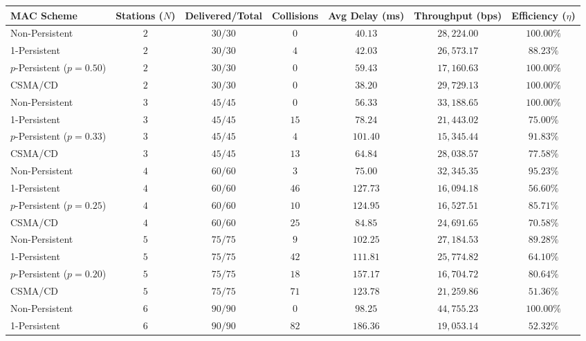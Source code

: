 \documentclass[11pt,a4paper]{article}
\begin{document}
\begin{table}[htbp]
\centering
\scriptsize
\renewcommand{\arraystretch}{1.15}
\begin{tabular}{l c c c c c c}
\rowcolor{tableheader}
\color{white}MAC Scheme & \color{white}Stations ($N$) & \color{white}Delivered/Total & \color{white}Collisions & \color{white}Avg Delay (ms) & \color{white}Throughput (bps) & \color{white}Efficiency ($\eta$) \\
\hline
Non-Persistent & $2$ & $30 / 30$ & $0$ & $40.13$ & $28{,}224.00$ & $100.00\%$ \\
1-Persistent & $2$ & $30 / 30$ & $4$ & $42.03$ & $26{,}573.17$ & $88.23\%$ \\
$p$-Persistent ($p=0.50$) & $2$ & $30 / 30$ & $0$ & $59.43$ & $17{,}160.63$ & $100.00\%$ \\
CSMA/CD & $2$ & $30 / 30$ & $0$ & $38.20$ & $29{,}729.13$ & $100.00\%$ \\
\hline
Non-Persistent & $3$ & $45 / 45$ & $0$ & $56.33$ & $33{,}188.65$ & $100.00\%$ \\
1-Persistent & $3$ & $45 / 45$ & $15$ & $78.24$ & $21{,}443.02$ & $75.00\%$ \\
$p$-Persistent ($p=0.33$) & $3$ & $45 / 45$ & $4$ & $101.40$ & $15{,}345.44$ & $91.83\%$ \\
CSMA/CD & $3$ & $45 / 45$ & $13$ & $64.84$ & $28{,}038.57$ & $77.58\%$ \\
\hline
Non-Persistent & $4$ & $60 / 60$ & $3$ & $75.00$ & $32{,}345.35$ & $95.23\%$ \\
1-Persistent & $4$ & $60 / 60$ & $46$ & $127.73$ & $16{,}094.18$ & $56.60\%$ \\
$p$-Persistent ($p=0.25$) & $4$ & $60 / 60$ & $10$ & $124.95$ & $16{,}527.51$ & $85.71\%$ \\
CSMA/CD & $4$ & $60 / 60$ & $25$ & $84.85$ & $24{,}691.65$ & $70.58\%$ \\
\hline
Non-Persistent & $5$ & $75 / 75$ & $9$ & $102.25$ & $27{,}184.53$ & $89.28\%$ \\
1-Persistent & $5$ & $75 / 75$ & $42$ & $111.81$ & $25{,}774.82$ & $64.10\%$ \\
$p$-Persistent ($p=0.20$) & $5$ & $75 / 75$ & $18$ & $157.17$ & $16{,}704.72$ & $80.64\%$ \\
CSMA/CD & $5$ & $75 / 75$ & $71$ & $123.78$ & $21{,}259.86$ & $51.36\%$ \\
\hline
Non-Persistent & $6$ & $90 / 90$ & $0$ & $98.25$ & $44{,}755.23$ & $100.00\%$ \\
1-Persistent & $6$ & $90 / 90$ & $82$ & $186.36$ & $19{,}053.14$ & $52.32\%$ \\

\end{tabular}
\end{table}
\end{document}

